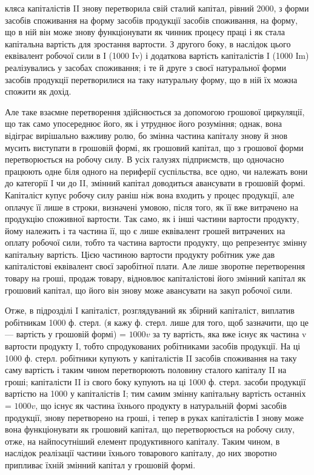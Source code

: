\parcont{}  %
кляса капіталістів II знову перетворила свій сталий капітал, рівний 2000,
з форми засобів споживання на форму засобів продукції засобів споживання,
на форму, що в ній він може знову функціонувати як чинник
процесу праці і як стала капітальна вартість для зростання вартости. З
другого боку, в наслідок цього еквівалент робочої сили в І (1000 Iv)
і додаткова вартість капіталістів I (1000 Іm) реалізувались у засобах
споживання; і те й друге з своєї натуральної форми засобів продукції перетворилися
на таку натуральну форму, що в ній їх можна спожити як дохід.

Але таке взаємне перетворення здійснюється за допомогою грошової
циркуляції, що так само упосереднює його, як і утруднює його розуміння;
однак, вона відіграє вирішально важливу ролю, бо змінна частина капіталу
знову й знов мусить виступати в грошовій формі, як грошовий капітал,
що з грошової форми перетворюється на робочу силу. В усіх галузях
підприємств, що одночасно працюють одне біля одного на периферії
суспільства, все одно, чи належать вони до категорії I чи до II, змінний
капітал доводиться авансувати в грошовій формі. Капіталіст купує
робочу силу раніш ніж вона входить у процес продукції, але оплачує її
лише в строки, визначені умовою, після того, як її вже витрачено на
продукцію споживної вартости. Так само, як і інші частини вартости
продукту, йому належить і та частина її, що є лише еквівалент грошей
витрачених на оплату робочої сили, тобто та частина вартости продукту,
що репрезентує змінну капітальну вартість. Цією частиною вартости продукту
робітник уже дав капіталістові еквівалент своєї заробітної плати. Але
лише зворотне перетворення товару на гроші, продаж товару, відновлює
капіталістові його змінний капітал як грошовий капітал, що його він
знову може авансувати на закуп робочої сили.

Отже, в підрозділі I капіталіст, розглядуваний як збірний капіталіст,
виплатив робітникам 1000 ф. стерл. (я кажу ф. стерл. лише для того,
щоб зазначити, що це — вартість у грошовій формі) = $1000v$ за
ту вартість, яка вже існує як частина v вартости продукту I, тобто спродукованих
робітниками засобів продукції. На ці 1000 ф. стерл. робітники
купують у капіталістів II засобів споживання на таку саму вартість і таким
чином перетворюють половину сталого капіталу II на гроші; капіталісти II
із свого боку купують на ці 1000 ф. стерл. засоби продукції вартістю
на 1000 у капіталістів I; тим самим змінну капітальну вартість останніх
= $1000 v$, що існує як частина їхнього продукту в натуральній формі
засобів продукції, знову перетворено на гроші, і тепер в руках капіталістів
І знову може вона функціонувати як грошовий капітал, що перетворюється
на робочу силу, отже, на найпосутніший елемент продуктивного
капіталу. Таким чином, в наслідок реалізації частини їхнього товарового
капіталу, до них зворотно припливає їхній змінний капітал у
грошовій формі.

